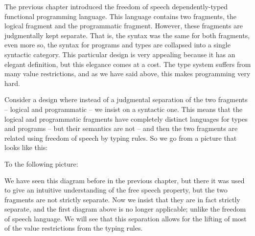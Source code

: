


\renewcommand{\Sepdrulename}[1]{{\normalfont\scriptsize \text{#1}}}
\renewcommand{\SepUdrulename}[1]{{\normalfont\scriptsize \text{#1}}}

The previous chapter introduced the freedom of speech
dependently-typed functional programming language. This language
contains two fragments, the logical fragment and the programmatic
fragment.  However, these fragments are judgmentally kept separate.
That is, the syntax was the same for both fragments, even more so, the
syntax for programs and types are collapsed into a single syntactic
category.  This particular design is very appealing because it has an
elegant definition, but this elegance comes at a cost.  The type
system suffers from many value restrictions, and as we have said
above, this makes programming very hard.

Consider a design where instead of a judgmental separation of the two
fragments -- logical and programmatic -- we insist on a syntactic one.
This means that the logical and programmatic fragments have completely
distinct languages for types and programs -- but their semantics are
not -- and then the two fragments are related using freedom of
speech by typing rules.  So we go from a
picture that looks like this:
\begin{center}
\end{center}
To the following picture:
\begin{center}
\end{center}
We have seen this diagram before in the previous chapter, but there it
was used to give an intuitive understanding of the free speech
property, but the two fragments are not strictly separate.  Now we
insist that they are in fact strictly separate, and the first diagram
above is no longer applicable; unlike the freedom of speech language.
We will see that this separation allows for the lifting of most of the
value restrictions from the typing rules.

